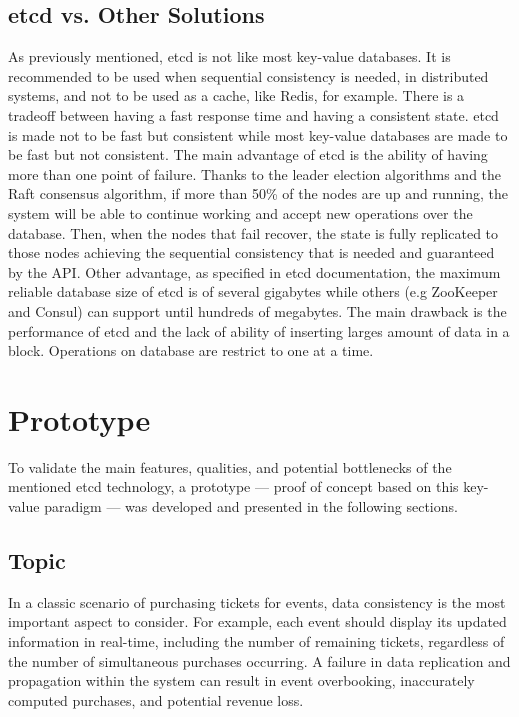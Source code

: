 \documentclass[screen,review]{acmart}
\begin{document}
\subsection{etcd vs. Other Solutions}
As previously mentioned, etcd is not like most key-value databases. It is recommended to be used when sequential consistency is needed, in distributed systems, and not to be used as a cache, like Redis, for example. There is a tradeoff between having a fast response time and having a consistent state. etcd is made not to be fast but consistent while most key-value databases are made to be fast but not consistent.
The main advantage of etcd is the ability of having more than one point of failure. Thanks to the leader election algorithms and the Raft consensus algorithm, if more than 50\% of the nodes are up and running, the system will be able to continue working and accept new operations over the database. Then, when the nodes that fail recover, the state is fully replicated to those nodes achieving the sequential consistency that is needed and guaranteed by the API.
Other advantage, as specified in etcd documentation, the maximum reliable database size of etcd is of several gigabytes while others (e.g ZooKeeper and Consul) can support until hundreds of megabytes.
The main drawback is the performance of etcd and the lack of ability of inserting larges amount of data in a block. Operations on database are restrict to one at a time.

\section{Prototype}
To validate the main features, qualities, and potential bottlenecks of the mentioned etcd technology, a prototype — proof of concept based on this key-value paradigm — was developed and presented in the following sections.

\subsection{Topic}
In a classic scenario of purchasing tickets for events, data consistency is the most important aspect to consider. For example, each event should display its updated information in real-time, including the number of remaining tickets, regardless of the number of simultaneous purchases occurring. A failure in data replication and propagation within the system can result in event overbooking, inaccurately computed purchases, and potential revenue loss.
\end{document}
